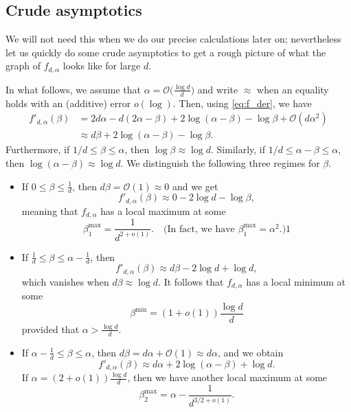 \documentclass[12pt]{amsart}
\theoremstyle{definition}
\newcommand\ds{\displaystyle}
\newcommand\Oc{\mathcal{O}}  %
\newcommand\al{\alpha}
\newcommand\be{\beta}
\newcommand\eps{\varepsilon}
\begin{document}
\subsection{Crude asymptotics} \label{sec:crude}
%
We will not need this when we do our precise calculations later on; nevertheless let us quickly do some crude asymptotics to get a rough picture of what the graph of $f_{d,\al}$ looks like for large $d$. 

In what follows, we assume that $\al =\Oc\big( \frac{\log d}{d} \big)$ and write $\approx$ when an equality holds with an (additive) error $o(\log)$. Then, using \eqref{eq:f_der}, we have   
%
\begin{align*}
f'_{d,\al}(\be) &= 
2d\al - d(2\al-\be) + 2\log(\al-\be) - \log \be 
+ \Oc(d\al^2)\\
&\approx d\be + 2\log(\al-\be) - \log \be .
\end{align*}
%
Furthermore, if $1/d \leq \be \leq \al$, then $\log \be \approx \log d$. Similarly, if $1/d \leq \al-\be \leq \al$, then  $\log (\al-\be) \approx \log d$. We distinguish the following three regimes for $\be$.
%
\begin{itemize}
%
\item If $0 \leq \be \leq \frac{1}{d}$, then $d \be = \Oc(1) \approx 0$ and we get  
%
\[ f'_{d,\al}(\be) \approx 0 -2 \log d - \log \be ,\]
%
meaning that $f_{d,\al}$ has a local maximum at some %
\[ \be_1^{\max}=\frac{1}{d^{2+o(1)}} .
\quad \text{(In fact, we have } \be_1^{\max}=\al^2 .) 1\]
%
\item If $\ds \frac{1}{d} \leq \be \leq \al - \frac{1}{d}$, then   
%
\[ f'_{d,\al}(\be) \approx d \be - 2\log d + \log d ,\]
%
which vanishes when $d \be \approx \log d$. It follows that $f_{d,\al}$ has a local minimum at some 
%
\[ \be^{\min} = (1+o(1)) \frac{\log d}{d} \] 
%
provided that $\al> \frac{\log d}{d}$.
%

%
\item If $\ds \al - \frac{1}{d} \leq \be \leq \al$, then $d \be = d \al + \Oc(1) \approx d \al$, and we obtain 
%
\[ f'_{d,\al}(\be) \approx d \al + 2\log(\al-\be) + \log d .\]
%
If $\al = (2+o(1)) \frac{\log d}{d}$, then we have another local maximum at some 
%
\[ \be_2^{\max} = \al - \frac{1}{d^{3/2+o(1)}} . \]
%
\end{itemize}
%
\end{document}
